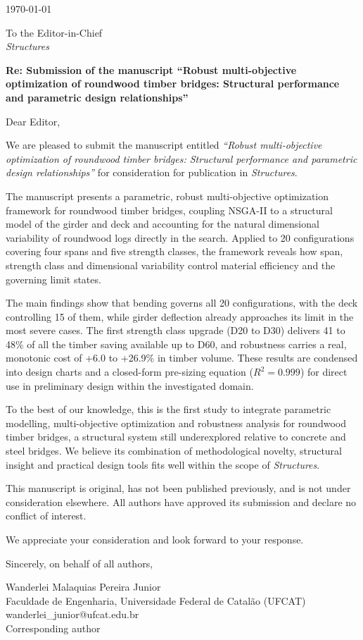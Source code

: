 \clearpage
\thispagestyle{empty}
\begingroup
\setlength{\parindent}{0pt}

\today

\bigskip
To the Editor-in-Chief \\
\textit{Structures}

\bigskip
\textbf{Re: Submission of the manuscript ``Robust multi-objective optimization of roundwood timber bridges: Structural performance and parametric design relationships''}

\bigskip
Dear Editor,

\bigskip
We are pleased to submit the manuscript entitled \textit{``Robust multi-objective optimization of roundwood timber bridges: Structural performance and parametric design relationships''} for consideration for publication in \textit{Structures}.

The manuscript presents a parametric, robust multi-objective optimization framework for roundwood timber bridges, coupling NSGA-II to a structural model of the girder and deck and accounting for the natural dimensional variability of roundwood logs directly in the search. Applied to 20 configurations covering four spans and five strength classes, the framework reveals how span, strength class and dimensional variability control material efficiency and the governing limit states.

The main findings show that bending governs all 20 configurations, with the deck controlling 15 of them, while girder deflection already approaches its limit in the most severe cases. The first strength class upgrade (D20 to D30) delivers 41 to 48\% of all the timber saving available up to D60, and robustness carries a real, monotonic cost of +6.0 to +26.9\% in timber volume. These results are condensed into design charts and a closed-form pre-sizing equation ($R^2 = 0.999$) for direct use in preliminary design within the investigated domain.

To the best of our knowledge, this is the first study to integrate parametric modelling, multi-objective optimization and robustness analysis for roundwood timber bridges, a structural system still underexplored relative to concrete and steel bridges. We believe its combination of methodological novelty, structural insight and practical design tools fits well within the scope of \textit{Structures}.

This manuscript is original, has not been published previously, and is not under consideration elsewhere. All authors have approved its submission and declare no conflict of interest.

We appreciate your consideration and look forward to your response.

\bigskip
Sincerely, on behalf of all authors,

\bigskip
Wanderlei Malaquias Pereira Junior \\
Faculdade de Engenharia, Universidade Federal de Catalão (UFCAT) \\
wanderlei\_junior@ufcat.edu.br \\
Corresponding author

\endgroup
